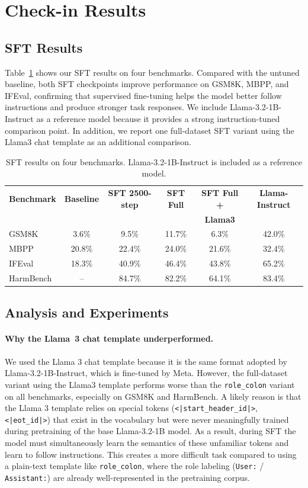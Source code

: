 \documentclass[11pt]{article}
\begin{document}
\section{Check-in Results}
\subsection{SFT Results}
Table~\ref{tab:sft_results} shows our SFT results on four benchmarks. Compared with the untuned baseline, both SFT checkpoints improve performance on GSM8K, MBPP, and IFEval, confirming that supervised fine-tuning helps the model better follow instructions and produce stronger task responses. We include Llama-3.2-1B-Instruct as a reference model because it 
provides a strong instruction-tuned comparison point. In addition, we report one full-dataset SFT variant using the Llama3 chat template as an additional comparison.
\begin{table}[htbp]
\centering
\small
\begin{tabular}{lccccc}
\hline
\textbf{Benchmark} & \textbf{Baseline} & \textbf{SFT 2500-step} & \textbf{SFT Full} & \textbf{SFT Full +} & \textbf{Llama-Instruct} \\
 &  &  &  & \textbf{Llama3} &  \\
\hline
GSM8K     & 3.6\%  & 9.5\%  & 11.7\% & 6.3\%  & 42.0\% \\
MBPP      & 20.8\% & 22.4\% & 24.0\% & 21.6\% & 32.4\% \\
IFEval    & 18.3\% & 40.9\% & 46.4\% & 43.8\% & 65.2\% \\
HarmBench & --     & 84.7\% & 82.2\% & 64.1\% & 83.4\% \\
\hline
\end{tabular}
\caption{SFT results on four benchmarks. Llama-3.2-1B-Instruct is included as a reference model.}
\label{tab:sft_results}
\end{table}

\subsection{Analysis and Experiments}
\paragraph{Why the Llama~3 chat template underperformed.}
We used the Llama 3 chat template because it is the same format adopted by Llama-3.2-1B-Instruct, which is fine-tuned by Meta. However, the full-dataset variant using the Llama3 template performs worse than the \texttt{role\_colon} variant on all benchmarks, especially on GSM8K and HarmBench. A likely reason is that the Llama 3 template relies on special tokens (\texttt{<|start\_header\_id|>}, \texttt{<|eot\_id|>}) that exist in the vocabulary but were never meaningfully trained during pretraining of the base Llama-3.2-1B model. As a result, during SFT the model must simultaneously learn the semantics of these unfamiliar tokens and learn to follow instructions. This creates a more difficult task compared to using a plain-text template like \texttt{role\_colon}, where the role labeling (\texttt{User:} / \texttt{Assistant:}) are already well-represented in the pretraining corpus.
\end{document}
